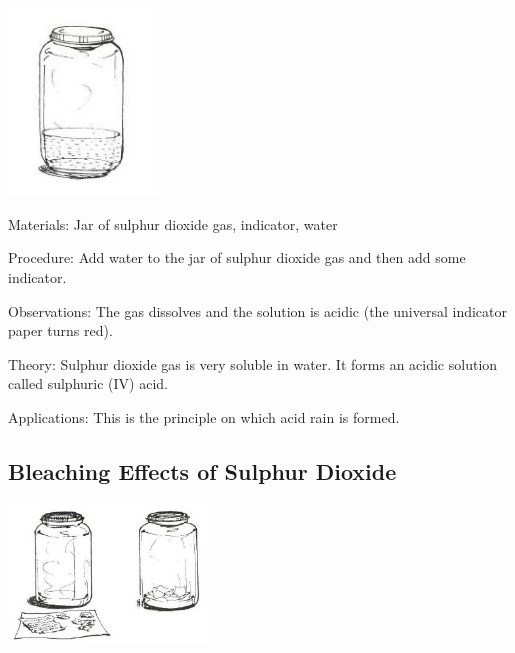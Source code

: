 \begin{multicols}{2}
\begin{center}
\includegraphics[width=0.3\textwidth]{./img/source/sulphuric-acid.jpg}
\end{center}

\begin{description*}
\item[Materials:]{Jar of sulphur dioxide gas, indicator, water}
\item[Procedure:]{Add water to the jar of sulphur dioxide gas and
then add some indicator.}
\item[Observations:]{The gas dissolves and the solution is acidic
(the universal indicator paper turns red).}
\item[Theory:]{Sulphur dioxide gas is very soluble in water.
It forms an acidic solution called sulphuric (IV)
acid. }
\item[Applications:]{This is the principle on which acid rain is
formed.}
\end{description*}

\subsection{Bleaching Effects of Sulphur Dioxide}

\begin{center}
\includegraphics[width=0.4\textwidth]{./img/source/sulphur-dioxide-bleaching.jpg}
\end{center}


\end{multicols}
